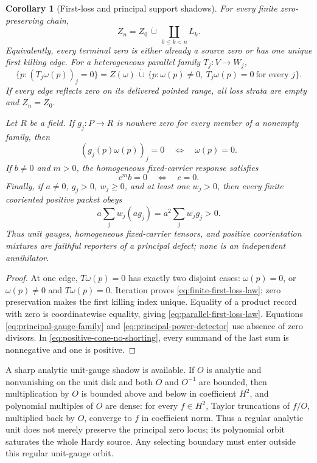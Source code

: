 \documentclass[11pt]{article}
\newtheorem{corollary}[theorem]{Corollary}
\theoremstyle{definition}
\theoremstyle{remark}
\begin{document}
\begin{corollary}[First-loss and principal support shadows]
\label{thm:first-loss-law}
For every finite zero-preserving chain,
\[
             Z_n=Z_0\,\dot\cup\,
                 \coprod_{0\le k<n}L_k .
\tag{2.F1}\label{eq:finite-first-loss-law}
\]
Equivalently, every terminal zero is either already a source zero or has one
unique first killing edge.  For a heterogeneous parallel family
\(T_j:V\to W_j\),
\[
 \{p:(T_j\omega(p))_j=0\}
 =Z(\omega)\,\dot\cup\,
   \{p:\omega(p)\ne0,\ T_j\omega(p)=0\ \text{for every }j\}.
\tag{2.F2}\label{eq:parallel-first-loss-law}
\]
If every edge reflects zero on its delivered pointed range, all loss strata
are empty and \(Z_n=Z_0\).

Let \(R\) be a field.  If \(g_j:P\to R\) is nowhere zero for every member of
a nonempty family, then
\[
       (g_j(p)\omega(p))_j=0
       \quad\Longleftrightarrow\quad \omega(p)=0.
\tag{2.F3}\label{eq:principal-gauge-family}
\]
If \(b\ne0\) and \(m>0\), the homogeneous fixed-carrier response satisfies
\[
                         c^m b=0\quad\Longleftrightarrow\quad c=0.
\tag{2.F4}\label{eq:principal-power-detector}
\]
Finally, if \(a\ne0\), \(g_j>0\), \(w_j\ge0\), and at least one \(w_j>0\),
then every finite cooriented positive packet obeys
\[
             a\sum_jw_j(ag_j)=a^2\sum_jw_jg_j>0.
\tag{2.F5}\label{eq:positive-cone-no-shorting}
\]
Thus unit gauges, homogeneous fixed-carrier tensors, and positive
coorientation mixtures are faithful reporters of a principal defect; none
is an independent annihilator.
\end{corollary}

\begin{proof}
At one edge, \(T\omega(p)=0\) has exactly two disjoint cases:
\(\omega(p)=0\), or \(\omega(p)\ne0\) and \(T\omega(p)=0\).
Iteration proves \eqref{eq:finite-first-loss-law}; zero preservation makes
the first killing index unique.  Equality of a product record with zero is
coordinatewise equality, giving \eqref{eq:parallel-first-loss-law}.
Equations \eqref{eq:principal-gauge-family} and
\eqref{eq:principal-power-detector} use absence of zero divisors.  In
\eqref{eq:positive-cone-no-shorting}, every summand of the last sum is
nonnegative and one is positive.
\end{proof}

A sharp analytic unit-gauge shadow is available.  If \(O\) is analytic and
nonvanishing on the unit disk and both \(O\) and \(O^{-1}\) are bounded, then
multiplication by \(O\) is bounded above and below in coefficient \(H^2\),
and polynomial multiples of \(O\) are dense: for every \(f\in H^2\), Taylor
truncations of \(f/O\), multiplied back by \(O\), converge to \(f\) in
coefficient norm.  Thus a regular analytic unit does not merely preserve the
principal zero locus; its polynomial orbit saturates the whole Hardy source.
Any selecting boundary must enter outside this regular unit-gauge orbit.
\end{document}
